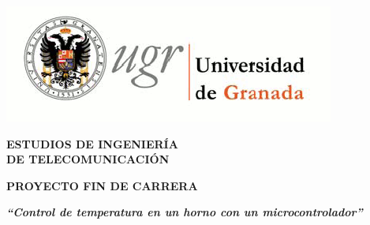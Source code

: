 
 \setcounter{page}{1}

\thispagestyle{empty}
%

\newpage

\thispagestyle{empty}

\begin{center}
\textbf{\huge \includegraphics[scale=0.8]{logo_ugr.png}}
\par\end{center}{\huge \par}

\begin{center}
\vspace*{1cm} 
\par\end{center}

\begin{center}
\textbf{\large ESTUDIOS DE INGENIERÍA }\\
\textbf{\large DE TELECOMUNICACIÓN}
\par\end{center}{\large \par}

\begin{center}
\textbf{\large PROYECTO FIN DE CARRERA}
\par\end{center}{\large \par}

\begin{center}

\par\end{center}

\begin{center}
\textbf{\emph{\LARGE {}``Control de temperatura en un horno con un microcontrolador''}}
\par\end{center}{\LARGE \par}

